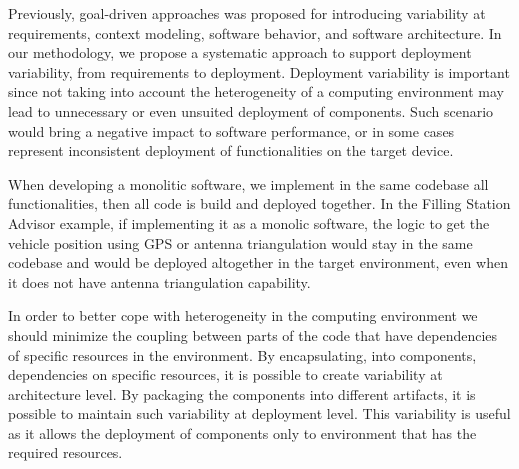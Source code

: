 Previously, goal-driven  approaches was proposed for introducing variability at requirements, context modeling, software behavior, and software architecture\cite{yu_goals_2008}\cite{angelopoulos_capturing_2015}.
In our methodology, we propose a systematic approach to support deployment variability, from requirements to deployment.
Deployment variability is important since not taking into account the heterogeneity of a computing environment may lead to unnecessary or even unsuited deployment of components.
Such scenario would bring a negative impact to software performance, or in some cases represent inconsistent deployment of functionalities on the target device.


When developing a monolitic software, we implement in the same codebase all functionalities, then all code is build and deployed together.
In the Filling Station Advisor example, if implementing it as a monolic software, the logic to get the vehicle position using GPS or antenna triangulation would stay in the same codebase and would be deployed altogether in the target environment, even when it does not have antenna triangulation capability.



In order to better cope with heterogeneity in the computing environment we should minimize the coupling between parts of the code that have dependencies of specific resources in the environment.
By encapsulating, into components, dependencies on specific resources, it is possible to create variability at architecture level. By packaging the components into different artifacts, it is possible to maintain such variability at deployment level. This variability is useful as it allows the deployment of components only to environment that has the required resources.

